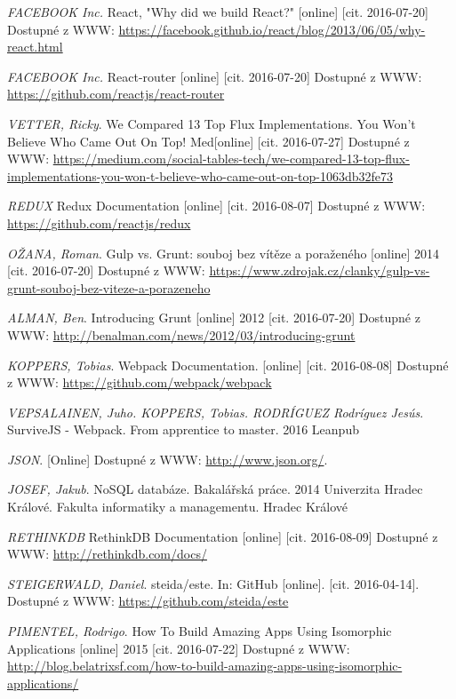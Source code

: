 \begin{thebibliography}{10}
 \textit{FACEBOOK Inc.} React, "Why did we build React?" [online] [cit. 2016-07-20]
Dostupné z WWW: \url{https://facebook.github.io/react/blog/2013/06/05/why-react.html}

 \textit{FACEBOOK Inc.} React-router [online] [cit. 2016-07-20] Dostupné z WWW: \url{https://github.com/reactjs/react-router}

 \textit{VETTER, Ricky}. We Compared 13 Top Flux Implementations. You Won’t Believe Who Came Out On Top! Med[online] [cit. 2016-07-27] Dostupné z WWW: \url{https://medium.com/social-tables-tech/we-compared-13-top-flux-implementations-you-won-t-believe-who-came-out-on-top-1063db32fe73}

 \textit{REDUX} Redux Documentation [online] [cit. 2016-08-07] Dostupné z WWW: \url{https://github.com/reactjs/redux}

 \textit{OŽANA, Roman}. Gulp vs. Grunt: souboj bez vítěze a poraženého [online] 2014 [cit. 2016-07-20] Dostupné z WWW: \url{https://www.zdrojak.cz/clanky/gulp-vs-grunt-souboj-bez-viteze-a-porazeneho}

 \textit{ALMAN, Ben}. Introducing Grunt [online] 2012 [cit. 2016-07-20] Dostupné z WWW: \url{http://benalman.com/news/2012/03/introducing-grunt}

 \textit{KOPPERS, Tobias}. Webpack Documentation. [online] [cit. 2016-08-08] Dostupné z WWW: \url{https://github.com/webpack/webpack}

 \textit{VEPSALAINEN, Juho. KOPPERS, Tobias. RODRÍGUEZ Rodríguez Jesús}. SurviveJS - Webpack. From apprentice to master. 2016 Leanpub

 \textit{JSON}. [Online] Dostupné z WWW: \url{http://www.json.org/}.

 \textit{JOSEF, Jakub}. NoSQL databáze. Bakalářská práce. 2014 Univerzita Hradec Králové. Fakulta informatiky a managementu. Hradec Králové

 \textit{RETHINKDB} RethinkDB Documentation [online] [cit. 2016-08-09] Dostupné z WWW: \url{http://rethinkdb.com/docs/}

\textit{STEIGERWALD, Daniel}. steida/este. In: GitHub [online]. [cit. 2016-04-14]. Dostupné z WWW: \url{https://github.com/steida/este}

 \textit{PIMENTEL, Rodrigo}. How To Build Amazing Apps Using Isomorphic Applications [online] 2015 [cit. 2016-07-22] Dostupné z WWW: \url{http://blog.belatrixsf.com/how-to-build-amazing-apps-using-isomorphic-applications/}


\end{thebibliography}
